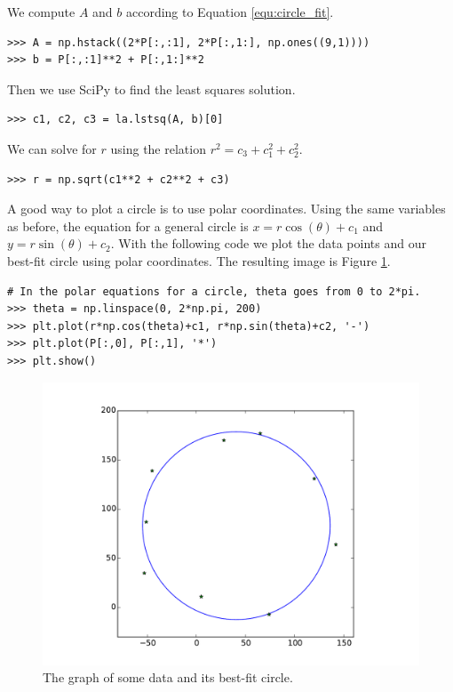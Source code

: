 We compute $A$ and $b$ according to Equation \ref{equ:circle_fit}.

\begin{lstlisting}
>>> A = np.hstack((2*P[:,:1], 2*P[:,1:], np.ones((9,1))))
>>> b = P[:,:1]**2 + P[:,1:]**2
\end{lstlisting}

Then we use SciPy to find the least squares solution.

\begin{lstlisting}
>>> c1, c2, c3 = la.lstsq(A, b)[0]
\end{lstlisting}

We can solve for $r$ using the relation $r^2 = c_3+c_1^2+c_2^2$.

\begin{lstlisting}
>>> r = np.sqrt(c1**2 + c2**2 + c3)
\end{lstlisting}

A good way to plot a circle is to use polar coordinates.
Using the same variables as before, the equation for a general circle is $x=r\cos(\theta)+c_1$ and $y=r\sin(\theta)+c_2$.
With the following code we plot the data points and our best-fit circle using polar coordinates.
The resulting image is Figure \ref{fig:circle}.

\begin{lstlisting}
# In the polar equations for a circle, theta goes from 0 to 2*pi.
>>> theta = np.linspace(0, 2*np.pi, 200)
>>> plt.plot(r*np.cos(theta)+c1, r*np.sin(theta)+c2, '-')
>>> plt.plot(P[:,0], P[:,1], '*')
>>> plt.show()
\end{lstlisting}

\begin{figure}[H]
    \includegraphics[width=\textwidth]{figures/circle.pdf}
    \caption{The graph of some data and its best-fit circle.}
    \label{fig:circle}
\end{figure}

